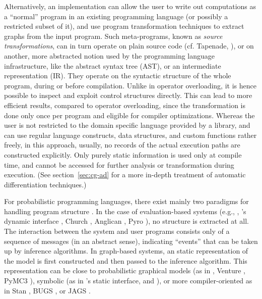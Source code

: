 Alternatively, an implementation can allow the user to write out computations as a \enquote{normal}
program in an existing programming language (or possibly a restricted subset of it), and use program
transformation techniques to extract graphs from the input program.  Such meta-programs, known as
\emph{source transformations}, can in turn operate on plain source code (cf. Tapenade,
\textcite{tapenadedevelopers2019tapenade}), or on another, more abstracted notion used by the
programming language infrastructure, like the abstract syntax tree (AST), or an intermediate
representation (IR).  They operate on the syntactic structure of the whole program, during or before
compilation.  Unlike in operator overloading, it is hence possible to inspect and exploit control
structures directly. This can lead to more efficient results, compared to operator overloading,
since the transformation is done only once per program and eligible for compiler optimizations.
Whereas the user is not restricted to the domain specific language provided by a library, and can
use regular language constructs, data structures, and custom functions rather freely, in this
approach, usually, no records of the actual execution paths are constructed explicitly.  Only purely
static information is used only at compile time, and cannot be accessed for further analysis or
transformation during execution.  (See section~\ref{sec:cg-ad} for a more in-depth treatment of
automatic differentiation techniques.)

For probabilistic programming languages, there exist mainly two paradigms for handling program
structure \parencite{vandemeent2018introduction}.  In the case of evaluation-based systems (e.g.,
\turingjl{} \parencite{ge2018turing}, 's dynamic interface
\parencite{cusumano-towner2020gen}, Church \parencite{goodman2012church}, Anglican
\parencite{wood2015new}, Pyro \parencite{bingham2018pyro}), no structure is extracted at all.  The
interaction between the system and user programs consists only of a sequence of messages (in an
abstract sense), indicating \enquote{events} that can be taken up by inference algorithms.  In
graph-based systems, an static representation of the model is first constructed and then passed to
the inference algorithm.  This representation can be close to probabilistic graphical models (as in
 \parencite{cox2018forneylab}, Venture \parencite{mansinghka2014venture},
PyMC3 \parencite{salvatier2016probabilistic}), symbolic (as in 's static
interface, and  \parencite{scherrer2019soss}), or more compiler-oriented as in
Stan \parencite{carpenter2017stan}, BUGS \parencite{lunn2000winbugs}, or JAGS
\parencite{plummer2003jags}.

